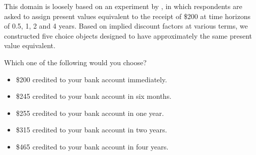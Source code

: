 This domain is loosely based on an experiment by , in which respondents are asked to assign present values equivalent to the receipt of \$200 at time horizons of 0.5, 1, 2 and 4 years.
Based on implied discount factors at various terms, we constructed five choice objects designed to have approximately the same present value equivalent.

\begin{tcolorbox}
Which one of the following would you choose?

\begin{itemize}
	\setlength\itemsep{-5pt}
	\item \$200 credited to your bank account immediately.
	\item \$245 credited to your bank account in six months.
	\item \$255 credited to your bank account in one year.
	\item \$315 credited to your bank account in two years.
	\item \$465 credited to your bank account in four years.
\end{itemize}
\end{tcolorbox}
